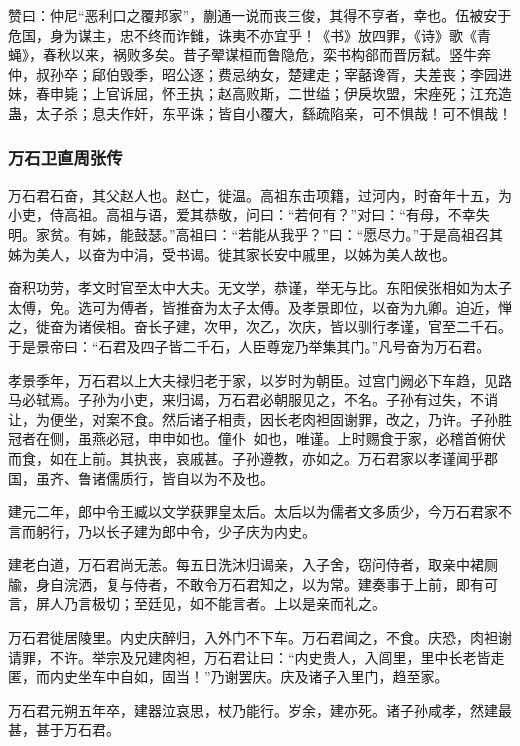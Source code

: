 \documentclass[]{article}
\begin{document}
赞曰：仲尼``恶利口之覆邦家''，蒯通一说而丧三俊，其得不亨者，幸也。伍被安于危国，身为谋主，忠不终而诈雠，诛夷不亦宜乎！《书》放四罪，《诗》歌《青蝇》，春秋以来，祸败多矣。昔子翚谋桓而鲁隐危，栾书构郤而晋厉弑。竖牛奔仲，叔孙卒；郈伯毁季，昭公逐；费忌纳女，楚建走；宰嚭谗胥，夫差丧；李园进妹，春申毙；上官诉屈，怀王执；赵高败斯，二世缢；伊戾坎盟，宋痤死；江充造蛊，太子杀；息夫作奸，东平诛；皆自小覆大，繇疏陷亲，可不惧哉！可不惧哉！

\hypertarget{header-n4026}{%
\subsubsection{万石卫直周张传}\label{header-n4026}}

万石君石奋，其父赵人也。赵亡，徙温。高祖东击项籍，过河内，时奋年十五，为小吏，侍高祖。高祖与语，爱其恭敬，问曰：``若何有？''对曰：``有母，不幸失明。家贫。有姊，能鼓瑟。''高祖曰：``若能从我乎？''曰：``愿尽力。''于是高祖召其姊为美人，以奋为中涓，受书谒。徙其家长安中戚里，以姊为美人故也。

奋积功劳，孝文时官至太中大夫。无文学，恭谨，举无与比。东阳侯张相如为太子太傅，免。选可为傅者，皆推奋为太子太傅。及孝景即位，以奋为九卿。迫近，惮之，徙奋为诸侯相。奋长子建，次甲，次乙，次庆，皆以驯行孝谨，官至二千石。于是景帝曰：``石君及四子皆二千石，人臣尊宠乃举集其门。''凡号奋为万石君。

孝景季年，万石君以上大夫禄归老于家，以岁时为朝臣。过宫门阙必下车趋，见路马必轼焉。子孙为小吏，来归谒，万石君必朝服见之，不名。子孙有过失，不诮让，为便坐，对案不食。然后诸子相责，因长老肉袒固谢罪，改之，乃许。子孙胜冠者在侧，虽燕必冠，申申如也。僮仆如也，唯谨。上时赐食于家，必稽首俯伏而食，如在上前。其执丧，哀戚甚。子孙遵教，亦如之。万石君家以孝谨闻乎郡国，虽齐、鲁诸儒质行，皆自以为不及也。

建元二年，郎中令王臧以文学获罪皇太后。太后以为儒者文多质少，今万石君家不言而躬行，乃以长子建为郎中令，少子庆为内史。

建老白道，万石君尚无恙。每五日洗沐归谒亲，入子舍，窃问侍者，取亲中裙厕牏，身自浣洒，复与侍者，不敢令万石君知之，以为常。建奏事于上前，即有可言，屏人乃言极切；至廷见，如不能言者。上以是亲而礼之。

万石君徙居陵里。内史庆醉归，入外门不下车。万石君闻之，不食。庆恐，肉袒谢请罪，不许。举宗及兄建肉袒，万石君让曰：``内史贵人，入闾里，里中长老皆走匿，而内史坐车中自如，固当！''乃谢罢庆。庆及诸子入里门，趋至家。

万石君元朔五年卒，建器泣哀思，杖乃能行。岁余，建亦死。诸子孙咸孝，然建最甚，甚于万石君。
\end{document}
